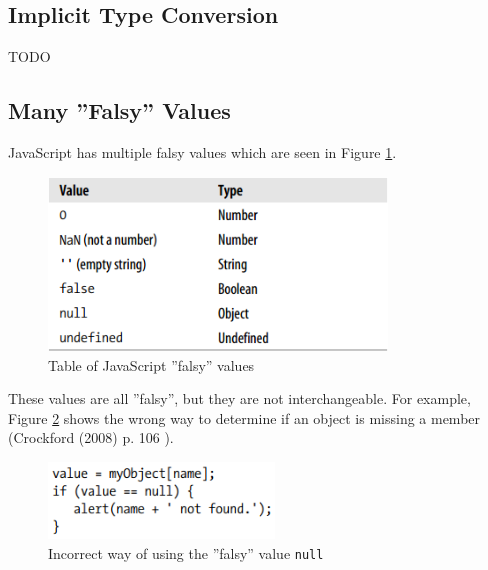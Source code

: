 	\subsection{Implicit Type Conversion} %
	\label{sub:implicit_type_conversion}
	TODO

	\subsection{Many ''Falsy'' Values} %
	\label{sub:many_falsy_values}
		JavaScript has multiple falsy values which are seen in Figure \ref{falsyValues}.

			\begin{figure}[H]
				\begin{center}
					\centerline{\includegraphics[width=9cm]{resources/images/FalsyValues.png}}
				\end{center}
				\caption{Table of JavaScript ''falsy'' values \cite{good_parts}}
				\label{falsyValues}
			\end{figure}

		These values are all ''falsy'', but they are not interchangeable. For example, Figure \ref{falsyExample} shows the wrong way to determine if an object is missing a member (Crockford (2008) p. 106 \cite{good_parts}).

					\begin{figure}[H]
				\begin{center}
					\centerline{\includegraphics[width=6cm]{resources/images/FalsyExample.png}}
				\end{center}
				\caption{Incorrect way of using the ''falsy'' value \texttt{null} \cite{good_parts}}
				\label{falsyExample}
			\end{figure}

